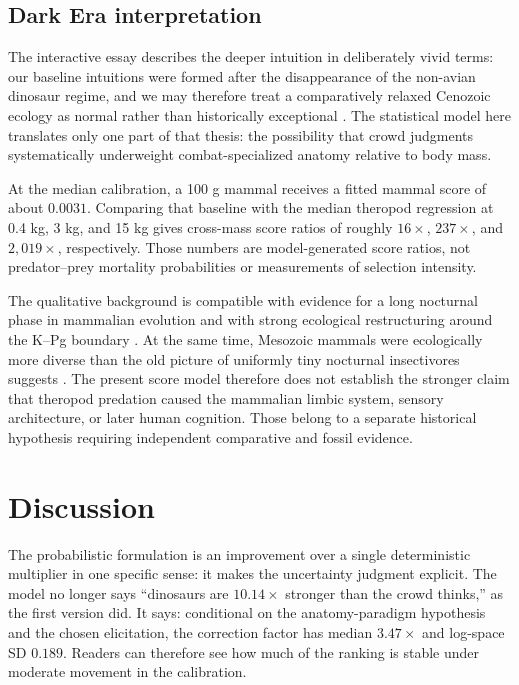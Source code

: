 \documentclass[11pt]{article}
\begin{document}
\subsection{Dark Era interpretation}
The interactive essay describes the deeper intuition in deliberately vivid terms: our baseline intuitions were formed after the disappearance of the non-avian dinosaur regime, and we may therefore treat a comparatively relaxed Cenozoic ecology as normal rather than historically exceptional \cite{benanderDino2026}. The statistical model here translates only one part of that thesis: the possibility that crowd judgments systematically underweight combat-specialized anatomy relative to body mass.

At the median calibration, a 100 g mammal receives a fitted mammal score of about $0.0031$. Comparing that baseline with the median theropod regression at 0.4 kg, 3 kg, and 15 kg gives cross-mass score ratios of roughly $16\times$, $237\times$, and $2,019\times$, respectively. Those numbers are model-generated score ratios, not predator--prey mortality probabilities or measurements of selection intensity.

The qualitative background is compatible with evidence for a long nocturnal phase in mammalian evolution and with strong ecological restructuring around the K--Pg boundary \cite{maor2017nocturnal,wilson2012multituberculates}. At the same time, Mesozoic mammals were ecologically more diverse than the old picture of uniformly tiny nocturnal insectivores suggests \cite{hu2005repenomamus}. The present score model therefore does not establish the stronger claim that theropod predation caused the mammalian limbic system, sensory architecture, or later human cognition. Those belong to a separate historical hypothesis requiring independent comparative and fossil evidence.

\section{Discussion}

The probabilistic formulation is an improvement over a single deterministic multiplier in one specific sense: it makes the uncertainty judgment explicit. The model no longer says ``dinosaurs are $10.14\times$ stronger than the crowd thinks,'' as the first version did. It says: conditional on the anatomy-paradigm hypothesis and the chosen elicitation, the correction factor has median $3.47\times$ and log-space SD $0.189$. Readers can therefore see how much of the ranking is stable under moderate movement in the calibration.
\end{document}
